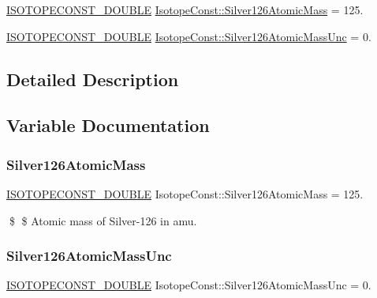 \begin{DoxyCompactItemize}
\item 
\mbox{\hyperlink{group___isotope_const-_macros_ga8f45a7272ce02c0b4c65c44636ed719a}{I\+S\+O\+T\+O\+P\+E\+C\+O\+N\+S\+T\+\_\+\+D\+O\+U\+B\+LE}} \mbox{\hyperlink{group___isotope_const-_silver-_ag126_ga567dee4c388ea9fefe90916577954b99}{Isotope\+Const\+::\+Silver126\+Atomic\+Mass}} = 125.
\item 
\mbox{\hyperlink{group___isotope_const-_macros_ga8f45a7272ce02c0b4c65c44636ed719a}{I\+S\+O\+T\+O\+P\+E\+C\+O\+N\+S\+T\+\_\+\+D\+O\+U\+B\+LE}} \mbox{\hyperlink{group___isotope_const-_silver-_ag126_gae1370456136511024e80745a2c253383}{Isotope\+Const\+::\+Silver126\+Atomic\+Mass\+Unc}} = 0.
\end{DoxyCompactItemize}


\subsection{Detailed Description}


\subsection{Variable Documentation}
\mbox{\label{group___isotope_const-_silver-_ag126_ga567dee4c388ea9fefe90916577954b99}} 
\subsubsection{\texorpdfstring{Silver126\+Atomic\+Mass}{Silver126AtomicMass}}
{\footnotesize\ttfamily \mbox{\hyperlink{group___isotope_const-_macros_ga8f45a7272ce02c0b4c65c44636ed719a}{I\+S\+O\+T\+O\+P\+E\+C\+O\+N\+S\+T\+\_\+\+D\+O\+U\+B\+LE}} Isotope\+Const\+::\+Silver126\+Atomic\+Mass = 125.}

\$ \$ Atomic mass of Silver-\/126 in amu. \mbox{\label{group___isotope_const-_silver-_ag126_gae1370456136511024e80745a2c253383}} 
\subsubsection{\texorpdfstring{Silver126\+Atomic\+Mass\+Unc}{Silver126AtomicMassUnc}}
{\footnotesize\ttfamily \mbox{\hyperlink{group___isotope_const-_macros_ga8f45a7272ce02c0b4c65c44636ed719a}{I\+S\+O\+T\+O\+P\+E\+C\+O\+N\+S\+T\+\_\+\+D\+O\+U\+B\+LE}} Isotope\+Const\+::\+Silver126\+Atomic\+Mass\+Unc = 0.}

